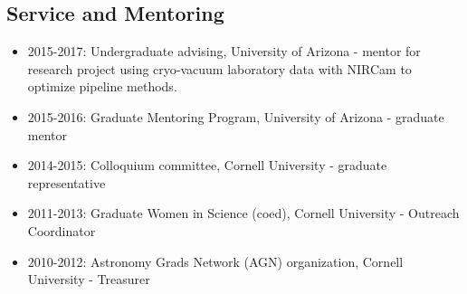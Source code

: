 \documentclass[11pt, oneside]{article}   	%
\begin{document}
\subsection*{Service and Mentoring}
\begin{itemize}[noitemsep]
    \item 2015-2017: Undergraduate advising, University of Arizona - mentor for research project using cryo-vacuum laboratory data with NIRCam to optimize pipeline methods.
    \item 2015-2016: Graduate Mentoring Program, University of Arizona - graduate mentor
    \item 2014-2015: Colloquium committee, Cornell University - graduate representative
    \item 2011-2013: Graduate Women in Science (coed), Cornell University - Outreach Coordinator
    \item2010-2012: Astronomy Grads Network (AGN) organization, Cornell University - Treasurer
\end{itemize}


\end{document}
